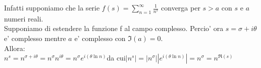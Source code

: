 \documentclass[12pt,a4paper]{article}
\begin{document}
\begin{flushleft}
\vspace{5mm}
Infatti supponiamo che la serie $f(s)=\sum_{n=1}^{\infty}{\frac{1}{n^{s}}}$ converga per $s>a$ con $s$ e $a$ numeri reali.\\
Supponiamo di estendere la funzione f al campo complesso. Percio' ora $s=\sigma+i\theta$ e' complesso mentre $a$ e' complesso con $\Im(a)=0$.\\
Allora:\\
\vspace{5mm}
$n^{s}=n^{\sigma+i\theta}=n^{\sigma}n^{i\theta}=n^{\sigma}e^{i(\theta\ln{n})}$\hspace{5mm}da cui\hspace{5mm}$|n^{s}|=|n^{\sigma}||e^{i(\theta\ln{n})}|=n^{\sigma}=n^{\Re(s)}$
\end{flushleft}
\end{document}

